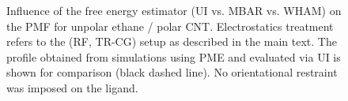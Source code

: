\documentclass[9pt,lessons]{livecoms}
\begin{document}
\begin{figure}
  \centering    
  \caption{
  Influence of the free energy estimator (UI vs. MBAR vs. WHAM) on the PMF for unpolar ethane / polar CNT. 
  Electrostatics treatment refers to the (RF, TR-CG) setup as described in the main text. The profile obtained from simulations using PME and evaluated via UI is shown for comparison (black dashed line).
  No orientational restraint was imposed on the ligand. 
  }
  \label{fig:polCNT_unpLig_estimator}
\end{figure}
\end{document}
